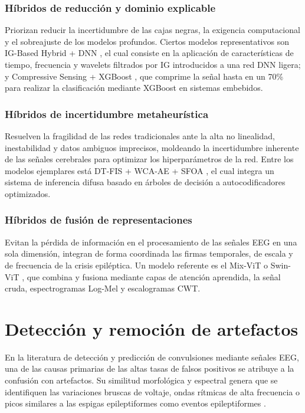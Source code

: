 \subsubsection{Híbridos de reducción y dominio explicable}
Priorizan reducir la incertidumbre de las cajas negras, la exigencia computacional y el sobreajuste de los modelos profundos. Ciertos modelos representativos son IG-Based Hybrid + DNN \cite{ikizlerEpilepticSeizureDetection2026}, el cual consiste en la aplicación de características de tiempo, frecuencia y wavelets filtrados por IG introducidos a una red DNN ligera; y Compressive Sensing + XGBoost \cite{djemal2025fast}, que comprime la señal hasta en un 70\% para realizar la clasificación mediante XGBoost en sistemas embebidos.

\subsubsection{Híbridos de incertidumbre metaheurística}
Resuelven la fragilidad de las redes tradicionales ante la alta no linealidad, inestabilidad y datos ambiguos imprecisos, moldeando la incertidumbre inherente de las señales cerebrales para optimizar los hiperparámetros de la red. Entre los modelos ejemplares está DT-FIS + WCA-AE + SFOA \cite{lak2026hybrid}, el cual integra un sistema de inferencia difusa basado en árboles de decisión a autocodificadores optimizados. 

\subsubsection{Híbridos de fusión de representaciones}
Evitan la pérdida de información en el procesamiento de las señales EEG en una sola dimensión, integran de forma coordinada las firmas temporales, de escala y de frecuencia de la crisis epiléptica. Un modelo referente es el Mix-ViT o Swin-ViT \cite{abualhassanEpilepticSeizureDetection2026}, que combina y fusiona mediante capas de atención aprendida, la señal cruda, espectrogramas Log-Mel y escalogramas CWT.

\section{Detección y remoción de artefactos}
En la literatura de detección y predicción de convulsiones mediante señales EEG, una de las causas primarias de las altas tasas de falsos positivos se atribuye a la confusión con artefactos. Su similitud morfológica y espectral genera que se identifiquen las variaciones bruscas de voltaje, ondas rítmicas de alta frecuencia o picos similares a las espigas epileptiformes como eventos epileptiformes \cite{afsariArtificialIntelligenceEpileptic2026}.


